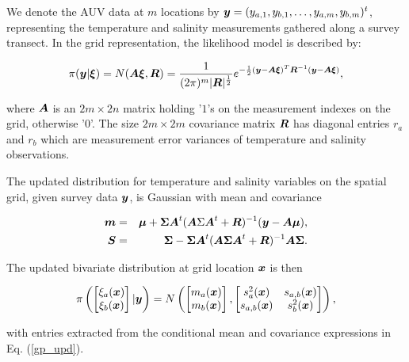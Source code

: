 \documentclass[aoas]{imsart}
\begin{document}
We denote the AUV data at $m$ locations by
${\boldsymbol y}=(y_{a,1},y_{b,1},\ldots,y_{a,m},y_{b,m})^t$, representing the
temperature and salinity measurements gathered along a survey
transect. In the grid representation, the likelihood model is
described by:

\begin{equation}\label{likelihood}
\pi(\by | \bxi)=N(\bA \bxi,\bR)= \frac{1}{(2\pi)^{m}|\bR|^{\frac{1}{2}}}e^{-\frac{1}{2}(\by -\bA\bxi)^T\bR^{-1}(\by-\bA\bxi)},
\end{equation}

where ${\boldsymbol A}$ is an $2m \times 2n$ matrix holding '$1$'s on the
measurement indexes on the grid, otherwise '$0$'. The size
$2m \times 2m$ covariance matrix ${\boldsymbol R}$ has diagonal entries $r_a$ and
$r_b$ which are measurement error variances of temperature and
salinity observations.

The updated distribution for temperature and salinity variables on the
spatial grid, given survey data ${\boldsymbol y}$, is Gaussian with mean and
covariance 

\begin{eqnarray}\label{gp_upd}
\bm &=& \bmu+\bSigma \bA^t (\bA \Sigma \bA^t+\bR)^{-1}(\by-\bA \bmu),  \\
\bS &=& \bSigma - \bSigma \bA^t (\bA \bSigma \bA^t+\bR)^{-1} \bA \bSigma.\nonumber
\end{eqnarray}

The updated bivariate distribution at grid location ${\boldsymbol x}$ is then 

\begin{equation}\label{gp_hat}
\pi 
\left(
\begin{bmatrix}
\xi_a(\bx) \\
\xi_b(\bx)
\end{bmatrix}
 |\by
 \right)
 = N \left( 
\begin{bmatrix} m_{a}(\bx)\\
m_{b}(\bx)
\end{bmatrix},\begin{bmatrix}
s_{a}^2(\bx) & s_{a,b}(\bx)  \\
s_{a,b}(\bx)  & s_{b}^2(\bx)  
\end{bmatrix}
\right),
\end{equation}

with entries extracted from the conditional mean and covariance
expressions in Eq. (\ref{gp_upd}). 
\end{document}
